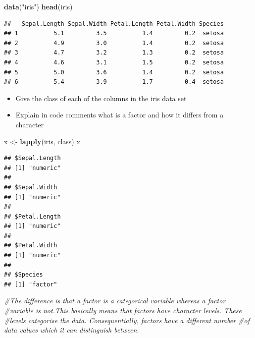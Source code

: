 \documentclass[]{article}
\newenvironment{Shaded}{\begin{snugshade}}{\end{snugshade}}
\newcommand{\CommentTok}[1]{\textcolor[rgb]{0.56,0.35,0.01}{\textit{#1}}}
\newcommand{\KeywordTok}[1]{\textcolor[rgb]{0.13,0.29,0.53}{\textbf{#1}}}
\newcommand{\NormalTok}[1]{#1}
\newcommand{\StringTok}[1]{\textcolor[rgb]{0.31,0.60,0.02}{#1}}
\providecommand{\tightlist}{%
  \setlength{\itemsep}{0pt}\setlength{\parskip}{0pt}}
\begin{document}
\begin{Shaded}
\begin{Highlighting}[]
\KeywordTok{data}\NormalTok{(}\StringTok{"iris"}\NormalTok{)}
\KeywordTok{head}\NormalTok{(iris)}
\end{Highlighting}
\end{Shaded}

\begin{verbatim}
##   Sepal.Length Sepal.Width Petal.Length Petal.Width Species
## 1          5.1         3.5          1.4         0.2  setosa
## 2          4.9         3.0          1.4         0.2  setosa
## 3          4.7         3.2          1.3         0.2  setosa
## 4          4.6         3.1          1.5         0.2  setosa
## 5          5.0         3.6          1.4         0.2  setosa
## 6          5.4         3.9          1.7         0.4  setosa
\end{verbatim}

\begin{itemize}
\tightlist
\item
  Give the class of each of the columns in the iris data set
\item
  Explain in code comments what is a factor and how it differs from a
  character
\end{itemize}

\begin{Shaded}
\begin{Highlighting}[]
\NormalTok{x <-}\StringTok{ }\KeywordTok{lapply}\NormalTok{(iris, class)}
\NormalTok{x}
\end{Highlighting}
\end{Shaded}

\begin{verbatim}
## $Sepal.Length
## [1] "numeric"
## 
## $Sepal.Width
## [1] "numeric"
## 
## $Petal.Length
## [1] "numeric"
## 
## $Petal.Width
## [1] "numeric"
## 
## $Species
## [1] "factor"
\end{verbatim}

\begin{Shaded}
\begin{Highlighting}[]
\CommentTok{#The difference is that a factor is a categorical variable whereas a factor #variable is not.This basically means that factors have character levels. These #levels categorise the data. Consequentially, factors have a different number #of data values which it can distinguish between.}
\end{Highlighting}
\end{Shaded}
\end{document}
